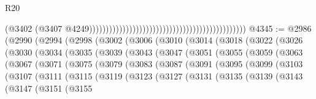 \begin{lexlean}{R20}
\begin{coremodule}
{                                                                                              (@3402
                                                                                                (@3407
                                                                                                  @4249)))))))))))))))))))))))))))))))))))))))))))))))
@4345 := @2986
    (@2990
      (@2994
        (@2998
          (@3002
            (@3006
              (@3010
                (@3014
                  (@3018
                    (@3022
                      (@3026
                        (@3030
                          (@3034
                            (@3035
                              (@3039
                                (@3043
                                  (@3047
                                    (@3051
                                      (@3055
                                        (@3059
                                          (@3063
                                            (@3067
                                              (@3071
                                                (@3075
                                                  (@3079
                                                    (@3083
                                                      (@3087
                                                        (@3091
                                                          (@3095
                                                            (@3099
                                                              (@3103
                                                                (@3107
                                                                  (@3111
                                                                    (@3115
                                                                      (@3119
                                                                        (@3123
                                                                          (@3127
                                                                            (@3131
                                                                              (@3135
                                                                                (@3139
                                                                                  (@3143
                                                                                    (@3147
                                                                                      (@3151
                                                                                        (@3155
}
\end{coremodule}
\end{lexlean}
